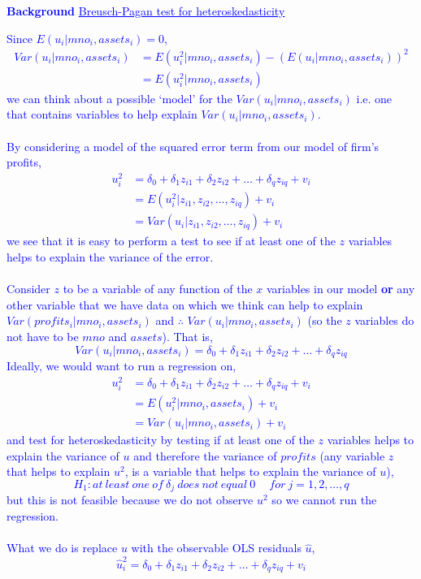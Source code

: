 \documentclass[12pt]{report}
\newenvironment{blueframed}[1][blue]
{\def\FrameCommand{\fboxsep=\FrameSep\fcolorbox{#1}{white}}%
\MakeFramed {\advance\hsize-\width \FrameRestore}}
{\endMakeFramed}
\begin{document}
\newpage
\justify
\begin{blueframed}
	\textcolor{blue}{\textbf{Background}}
	\vspace{-\baselineskip}
	\justify
	\textcolor{blue}{\underline{Breusch-Pagan test for heteroskedasticity}}
	
	\noindent \textcolor{blue}
	{
		\noindent Since $E(u_i|mno_i,assets_i)=0$, 
		\begin{align*}
		Var(u_i|mno_i,assets_i) &= E(u^2_i|mno_i,assets_i) - (E(u_i|mno_i,assets_i))^2 \\
		&= E(u^2_i|mno_i,assets_i)
		\end{align*}
		\noindent we can think about a possible `model' for the $Var(u_i|mno_i,assets_i)$ i.e. one that contains variables to help explain $Var(u_i|mno_i,assets_i)$. \\ \\ By considering a model of the squared error term from our model of firm's profits, 
		\begin{align*}
		u^2_i &= \delta_0 + \delta_1z_{i1} + \delta_2z_{i2} + \dots + \delta_qz_{iq} + v_i \\
		&= E(u^2_i|z_{i1},z_{i2},\dots,z_{iq}) + v_i \\ 
		&= Var(u_i|z_{i1},z_{i2},\dots,z_{iq}) + v_i
		\end{align*} we see that it is easy to perform a test to see if at least one of the $z$ variables helps to explain the variance of the error. 
		\\ \\ Consider $z$ to be a variable of any function of the $x$ variables in our model \textbf{or} any other variable that we have data on which we think can help to explain $Var(profits_i|mno_i,assets_i)$ and $\therefore$ $Var(u_i|mno_i,assets_i)$ (so the $z$ variables do not have to be $mno$ and $assets$). That is, $$Var(u_i|mno_i,assets_i) = \delta_0 + \delta_1z_{i1} + \delta_2z_{i2} + \dots + \delta_qz_{iq}$$
		\noindent Ideally, we would want to run a regression on,
		\begin{align*}
		u^2_i &= \delta_0 + \delta_1z_{i1} + \delta_2z_{i2} + \dots + \delta_qz_{iq} + v_i \\
		&= E(u^2_i|mno_i,assets_i) + v_i \\
		&= Var(u_i|mno_i,assets_i) + v_i
		\end{align*}
		\noindent and test for heteroskedasticity by testing if at least one of the $z$ variables helps to explain the variance of $u$ and therefore the variance of $profits$ (any variable $z$ that helps to explain $u^2$, is a variable that helps to explain the variance of $u$), $$H_1: at\ least\ one\ of\ \delta_j\ does\ not\ equal\ 0\ \quad for\ j=1,2,\dots,q$$ but this is not feasible because we do not observe $u^2$ so we cannot run the regression.
		\\ \\ What we do is replace $u$ with the observable OLS residuals $\hat{u}$,
		$$\hat{u}^2_i = \delta_0 + \delta_1z_{i1} + \delta_2z_{i2} + \dots + \delta_qz_{iq} + v_i$$
	}
\end{blueframed}
\end{document}
